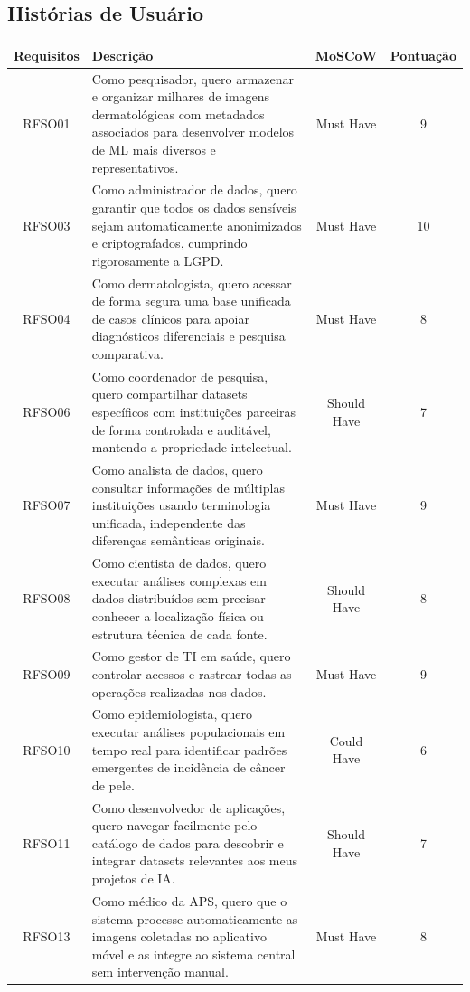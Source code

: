 \subsection{Histórias de Usuário}
\begin{table}[H]
    \centering
    \footnotesize 
    \begin{tabular}{|c|p{7cm}|c|c|}
    \hline
    \textbf{Requisitos} & \textbf{Descrição} & \textbf{MoSCoW} & \textbf{Pontuação} \\ \hline
    RFSO01 & Como pesquisador, quero armazenar e organizar milhares de imagens dermatológicas com metadados associados para desenvolver modelos de ML mais diversos e representativos. & Must Have & 9 \\ \hline
    RFSO03 & Como administrador de dados, quero garantir que todos os dados sensíveis sejam automaticamente anonimizados e criptografados, cumprindo rigorosamente a LGPD. & Must Have & 10 \\ \hline
    RFSO04 & Como dermatologista, quero acessar de forma segura uma base unificada de casos clínicos para apoiar diagnósticos diferenciais e pesquisa comparativa. & Must Have & 8 \\ \hline
    RFSO06 & Como coordenador de pesquisa, quero compartilhar datasets específicos com instituições parceiras de forma controlada e auditável, mantendo a propriedade intelectual. & Should Have & 7 \\ \hline
    RFSO07 & Como analista de dados, quero consultar informações de múltiplas instituições usando terminologia unificada, independente das diferenças semânticas originais. & Must Have & 9 \\ \hline
    RFSO08 & Como cientista de dados, quero executar análises complexas em dados distribuídos sem precisar conhecer a localização física ou estrutura técnica de cada fonte. & Should Have & 8 \\ \hline
    RFSO09 & Como gestor de TI em saúde, quero controlar acessos e rastrear todas as operações realizadas nos dados. & Must Have & 9 \\ \hline
    RFSO10 & Como epidemiologista, quero executar análises populacionais em tempo real para identificar padrões emergentes de incidência de câncer de pele. & Could Have & 6 \\ \hline
    RFSO11 & Como desenvolvedor de aplicações, quero navegar facilmente pelo catálogo de dados para descobrir e integrar datasets relevantes aos meus projetos de IA. & Should Have & 7 \\ \hline
    RFSO13 & Como médico da APS, quero que o sistema processe automaticamente as imagens coletadas no aplicativo móvel e as integre ao sistema central sem intervenção manual. & Must Have & 8 \\ \hline

\end{tabular}
\end{table}
